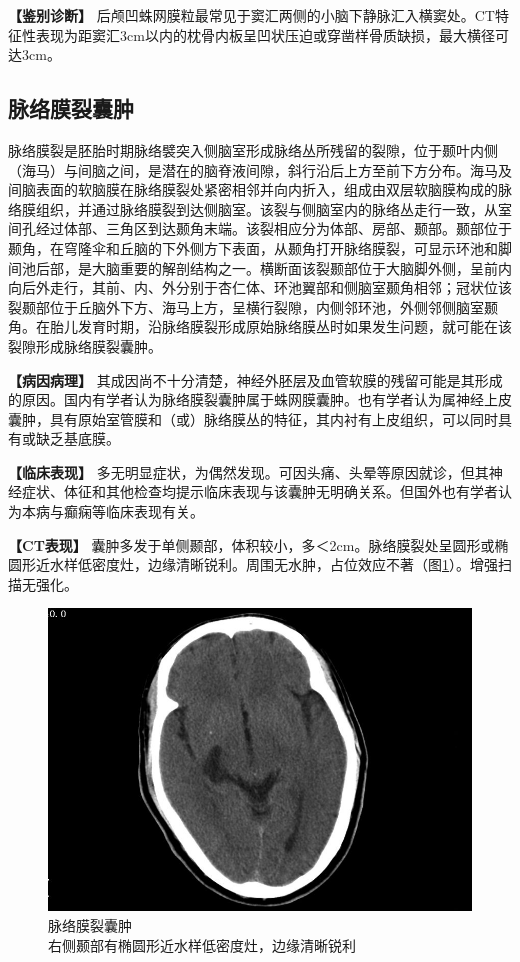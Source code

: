 \textbf{【鉴别诊断】}
后颅凹蛛网膜粒最常见于窦汇两侧的小脑下静脉汇入横窦处。CT特征性表现为距窦汇3cm以内的枕骨内板呈凹状压迫或穿凿样骨质缺损，最大横径可达3cm。

\subsection{脉络膜裂囊肿}

脉络膜裂是胚胎时期脉络襞突入侧脑室形成脉络丛所残留的裂隙，位于颞叶内侧（海马）与间脑之间，是潜在的脑脊液间隙，斜行沿后上方至前下方分布。海马及间脑表面的软脑膜在脉络膜裂处紧密相邻并向内折入，组成由双层软脑膜构成的脉络膜组织，并通过脉络膜裂到达侧脑室。该裂与侧脑室内的脉络丛走行一致，从室间孔经过体部、三角区到达颞角末端。该裂相应分为体部、房部、颞部。颞部位于颞角，在穹隆伞和丘脑的下外侧方下表面，从颞角打开脉络膜裂，可显示环池和脚间池后部，是大脑重要的解剖结构之一。横断面该裂颞部位于大脑脚外侧，呈前内向后外走行，其前、内、外分别于杏仁体、环池翼部和侧脑室颞角相邻；冠状位该裂颞部位于丘脑外下方、海马上方，呈横行裂隙，内侧邻环池，外侧邻侧脑室颞角。在胎儿发育时期，沿脉络膜裂形成原始脉络膜丛时如果发生问题，就可能在该裂隙形成脉络膜裂囊肿。

\textbf{【病因病理】}
其成因尚不十分清楚，神经外胚层及血管软膜的残留可能是其形成的原因。国内有学者认为脉络膜裂囊肿属于蛛网膜囊肿。也有学者认为属神经上皮囊肿，具有原始室管膜和（或）脉络膜丛的特征，其内衬有上皮组织，可以同时具有或缺乏基底膜。

\textbf{【临床表现】}
多无明显症状，为偶然发现。可因头痛、头晕等原因就诊，但其神经症状、体征和其他检查均提示临床表现与该囊肿无明确关系。但国外也有学者认为本病与癫痫等临床表现有关。

\textbf{【CT表现】}
囊肿多发于单侧颞部，体积较小，多＜2cm。脉络膜裂处呈圆形或椭圆形近水样低密度灶，边缘清晰锐利。周围无水肿，占位效应不著（图\ref{fig2-51}）。增强扫描无强化。

\begin{figure}[!htbp]
 \centering
 \includegraphics[width=.7\textwidth,height=\textheight,keepaspectratio]{./images/Image00083.jpg}
 \captionsetup{justification=centering}
 \caption{脉络膜裂囊肿\\{\small 右侧颞部有椭圆形近水样低密度灶，边缘清晰锐利}}
 \label{fig2-51}
  \end{figure} 


